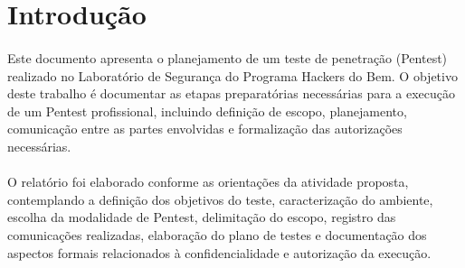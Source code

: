 \section{Introdução}

\paragraph{}
Este documento apresenta o planejamento de um teste de penetração (Pentest)
realizado no Laboratório de Segurança do Programa Hackers do Bem. O objetivo
deste trabalho é documentar as etapas preparatórias necessárias para a execução
de um Pentest profissional, incluindo definição de escopo, planejamento,
comunicação entre as partes envolvidas e formalização das autorizações
necessárias.

\paragraph{}
O relatório foi elaborado conforme as orientações da atividade proposta,
contemplando a definição dos objetivos do teste, caracterização do ambiente,
escolha da modalidade de Pentest, delimitação do escopo, registro das
comunicações realizadas, elaboração do plano de testes e documentação dos
aspectos formais relacionados à confidencialidade e autorização da execução.
